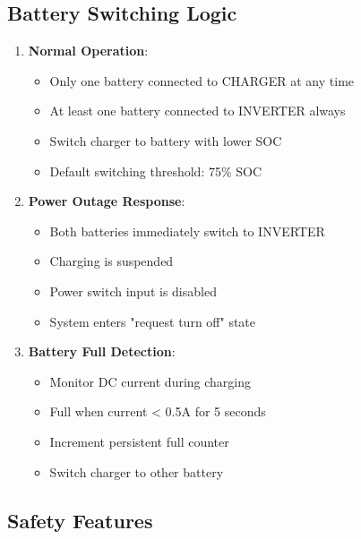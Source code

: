 \documentclass[11pt,a4paper]{article}
\begin{document}
\subsection{Battery Switching Logic}

\begin{enumerate}
    \item \textbf{Normal Operation}:
    \begin{itemize}
        \item Only one battery connected to CHARGER at any time
        \item At least one battery connected to INVERTER always
        \item Switch charger to battery with lower SOC
        \item Default switching threshold: 75\% SOC
    \end{itemize}
    
    \item \textbf{Power Outage Response}:
    \begin{itemize}
        \item Both batteries immediately switch to INVERTER
        \item Charging is suspended
        \item Power switch input is disabled
        \item System enters "request turn off" state
    \end{itemize}
    
    \item \textbf{Battery Full Detection}:
    \begin{itemize}
        \item Monitor DC current during charging
        \item Full when current < 0.5A for 5 seconds
        \item Increment persistent full counter
        \item Switch charger to other battery
    \end{itemize}
\end{enumerate}

\subsection{Safety Features}
\end{document}
